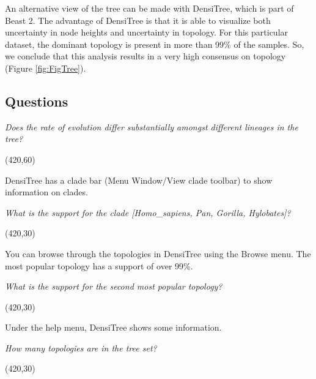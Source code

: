 \documentclass[11pt]{article}
\theoremstyle{plain}%
\theoremstyle{definition}
\theoremstyle{remark}
\begin{document}
An alternative view of the tree can be made with DensiTree, which is part of Beast 2. The advantage
of DensiTree is that it is able to visualize both uncertainty in node heights and uncertainty in topology.
For this particular dataset, the dominant topology is present in more than 99\% of the samples. So, 
we conclude that this analysis results in a very high consensus on topology (Figure \ref{fig:FigTree}).



\subsection*{Questions}
\vspace{5 mm}

\textit{Does the rate of evolution differ substantially amongst different lineages in the tree?}

\vspace{5 mm}
\framebox(420,60){}
\vspace{5 mm}

DensiTree has a clade bar (Menu Window/View clade toolbar) to show information on clades.

\textit{What is the support for the clade [Homo\_sapiens, Pan, Gorilla, Hylobates]?}

\vspace{5 mm}
\framebox(420,30){}
\vspace{5 mm}

You can browse through the topologies in DensiTree using the Browse menu.
The most popular topology has a support of over 99\%.

\textit{What is the support for the second most popular topology?}

\vspace{5 mm}
\framebox(420,30){}
\vspace{5 mm}

Under the help menu, DensiTree shows some information.

\textit{How many topologies are in the tree set?}

\vspace{5 mm}
\framebox(420,30){}
\vspace{5 mm}
\end{document}
